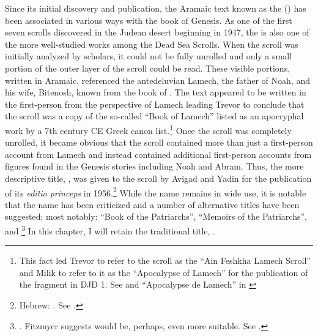 

Since its initial discovery and publication, the Aramaic text known as the \ga () has been associated in various ways with the book of Genesis. As one of the first seven scrolls discovered in the Judean desert beginning in 1947, the \ga is also one of the more well-studied works among the Dead Sea Scrolls. When the scroll was initially analyzed by scholars, it could not be fully unrolled and only a small portion of the outer layer of the scroll could be read. These visible portions, written in Aramaic, referenced the antedeluvian Lamech, the father of Noah, and his wife, Bitenosh, known from the book of \jub. The text appeared to be written in the first-person from the perspective of Lamech leading Trevor to conclude that the scroll was a copy of the so-called ``Book of Lamech'' listed as an apocryphal work by a 7th century CE Greek canon list.\footnote{This fact led Trevor to refer to the scroll as the ``Ain Feshkha Lamech Scroll'' and Milik to refer to it as the ``Apocalypse of Lamech'' for the publication of the fragment in DJD 1. See \cite[9--10]{trevor_basor1949} and ``Apocalypse de Lamech'' in \cite[86--87]{djd_1}} Once the scroll was completely unrolled, it became obvious that the scroll contained more than just a first-person account from Lamech and instead contained additional first-person accounts from figures found in the Genesis stories including Noah and Abram. Thus, the more descriptive title, , was given to the scroll by Avigad and Yadin for the publication of its \emph{editio princeps} in 1956.\footnote{Hebrew: . See \cite{avigad-yadin1956}.} While the name \ga remains in wide use, it is notable that the name has been criticized and a number of alternative titles have been suggested; most notably: ``Book of the Patriarchs''\autocite[Hebrew: . As suggested by Mazar in][379 n. 2]{flusser_ks1956}, ``Memoirs of the Patriarchs''\autocite[358]{gaster1976}, and \footnote{\cite[14 n. 1.]{milik1959}.  Fitzmyer suggests  would be, perhaps, even more suitable. See \cite[16]{fitzmyer2004}.} In this chapter, I will retain the traditional title, \ga.

